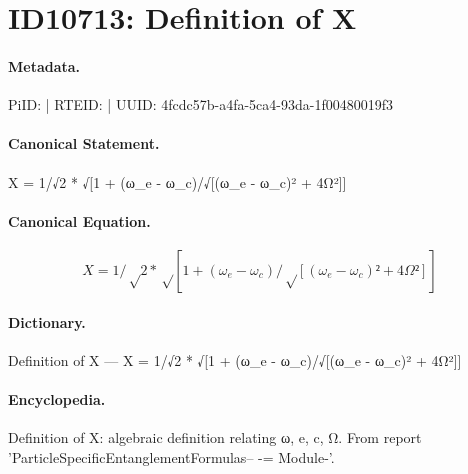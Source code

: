 \section*{ID10713: Definition of X}
\paragraph{Metadata.}
PiID:  | RTEID:  | UUID: 4fcdc57b-a4fa-5ca4-93da-1f00480019f3

\paragraph{Canonical Statement.}
X = 1/√2 * √[1 + (ω\_e - ω\_c)/√[(ω\_e - ω\_c)² + 4Ω²]]

\paragraph{Canonical Equation.}
\[
X = 1/√2 * √[1 + (ω_e - ω_c)/√[(ω_e - ω_c)² + 4Ω²]]
\]

\paragraph{Dictionary.}
Definition of X — X = 1/√2 * √[1 + (ω\_e - ω\_c)/√[(ω\_e - ω\_c)² + 4Ω²]]

\paragraph{Encyclopedia.}
Definition of X: algebraic definition relating ω, e, c, Ω. From report 'ParticleSpecificEntanglementFormulas-- -= Module-'.

